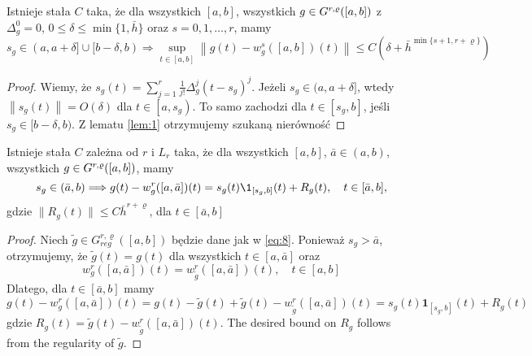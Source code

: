 \documentclass[oik, pdftex, robocza, man]{mgrwms}
\begin{document}
    \begin{cor}
        Istnieje stała $C$ taka, że dla wszystkich $[a,b]$, wszystkich $g \in G^{r,\varrho}([a,b])$ z $\Delta_{g}^{0} = 0$, $0 \leq \delta \leq \min \{1, \bar{h}\}$ oraz $s=0,1,\dots,r$, mamy
        \begin{equation*}
            s_{g} \in(a, a+\delta] \cup[b-\delta, b) \Longrightarrow  \sup_{t \in[a, b]}\left\|g(t)-w_{g}^{s}([a, b])(t)\right\| \leq C\left(\delta+\bar{h}^{\min \{s+1, r+\varrho\}}\right)
        \end{equation*}
    \end{cor}
    \begin{proof}
        Wiemy, że $s_{g}(t)=\sum_{j=1}^{r} \frac{1}{j !} \Delta_{g}^{j}\left(t-s_{g}\right)^{j}$. Jeżeli $s_{g} \in(a, a+\delta]$, wtedy $\left\|s_{g}(t)\right\|=O(\delta)$ dla $t \in\left[a, s_{g}\right) .$ To samo zachodzi dla $t \in\left[s_{g}, b\right]$, jeśli $s_{g} \in[b-\delta, b)$. Z lematu \eqref{lem:1} otrzymujemy szukaną nierówność
    \end{proof}

    \begin{lemma} \label{lem:2}
        Istnieje stała $C$ zależna od $r$ i $L_{r}$ taka, że dla wszystkich $[a,b]$, $\bar{a} \in (a,b)$, wszystkich $g \in G^{r,\varrho}([a,b])$, mamy
        \begin{equation*}
            s_{g} \in(\bar{a}, b) \Longrightarrow g(t)-w_{g}^{r}([a, \bar{a}])(t)=s_{g}(t) \1_{\left[s_{g}, b\right]}(t)+R_{g}(t), \quad t \in[\bar{a}, b],
        \end{equation*}
        gdzie $\| R_{g}(t) \| \leq C\bar{h}^{r+\varrho}$, dla $t \in [\bar{a}, b]$
    \end{lemma}
    \begin{proof}
        Niech $\tilde{g} \in G_{reg}^{r, \varrho}([a, b])$ będzie dane jak w \eqref{eq:8}. Ponieważ $s_{g}>\bar{a}$, otrzymujemy, że $\tilde{g}(t)=g(t)$ dla wszystkich $t \in[a, \bar{a}]$ oraz
        \begin{equation*}
            w_{g}^{r}([a, \bar{a}])(t)=w_{\tilde{g}}^{r}([a, \bar{a}])(t), \quad t \in[a, b]
        \end{equation*}
        Dlatego, dla $t \in[\bar{a}, b]$ mamy
        \begin{equation}
            g(t)-w_{g}^{r}([a, \bar{a}])(t)=g(t)-\tilde{g}(t)+\tilde{g}(t)-w_{\tilde{g}}^{r}([a, \bar{a}])(t)=s_{g}(t) \mathbf{1}_{\left[s_{g}, b\right]}(t)+R_{g}(t)
        \end{equation}
        gdzie $R_{g}(t)=\tilde{g}(t)-w_{\tilde{g}}^{r}([a, \bar{a}])(t) .$ The desired bound on $R_{g}$ follows from the regularity of $\tilde{g}$.    
    \end{proof}
\end{document}
